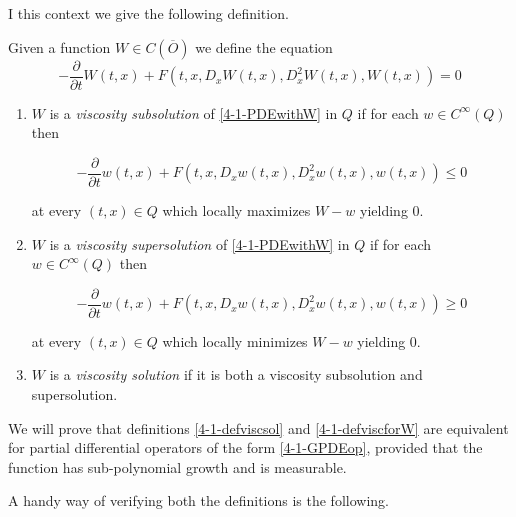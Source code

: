I this context we give the following definition.

\begin{definition}\label{4-1-defviscforW}
    Given a function $W\in C(\overline{O})$ we define the equation
    \begin{equation}\label{4-1-PDEwithW}
        -\frac{\partial}{\partial t}W(t,x) + F(t,x,D_xW(t,x),D_x^2W(t,x),W(t,x))=0
    \end{equation}

    \begin{enumerate}[label=(\alph*)]
        \item $W$ is a \textit{viscosity subsolution} of \ref{4-1-PDEwithW} in $Q$ if for each $w\in C^{\infty}(Q)$ then 
        
        \begin{equation}
            -\frac{\partial}{\partial t}w(t,x) + F(t,x,D_xw(t,x),D_x^2w(t,x),w(t,x))\leq0
        \end{equation}

        at every $(t,x)\in Q$ which locally maximizes $W-w$ yielding $0$.
        
        \item $W$ is a \textit{viscosity supersolution} of \ref{4-1-PDEwithW} in $Q$ if for each $w\in C^{\infty}(Q)$ then 
        
        \begin{equation}
            -\frac{\partial}{\partial t}w(t,x) + F(t,x,D_xw(t,x),D_x^2w(t,x),w(t,x))\geq0
        \end{equation}

        at every $(t,x)\in Q$ which locally minimizes $W-w$ yielding $0$.

        \item $W$ is a \textit{viscosity solution} if it is both a viscosity subsolution and supersolution.
    \end{enumerate}
\end{definition}

We will prove that definitions \ref{4-1-defviscsol} and \ref{4-1-defviscforW} are equivalent for partial differential operators 
of the form \ref{4-1-GPDEop}, provided that the function has sub-polynomial growth and is measurable.

A handy way of verifying both the definitions is the following.

